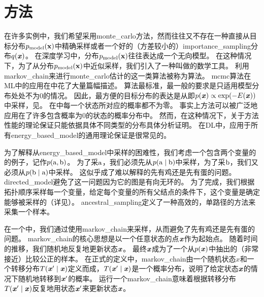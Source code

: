 \section{方法}
\label{sec:markov_chain_monte_carlo_methods}

在许多实例中，我们希望采用\gls{monte_carlo}方法，然而往往又不存在一种直接从目标分布$p_{\text{model}}(\mathbf{x})$中精确采样或者一个好的（方差较小的）\gls{importance_sampling}分布$q(\boldsymbol{\mathit{x}})$。
在深度学习中，分布$p_{\text{model}}(\mathbf{x})$往往表达成一个无向模型。
在这种情况下，为了从分布$p_{\text{model}}(\mathbf{x})$中近似采样，我们引入了一种叫做的数学工具。
利用\gls{markov_chain}来进行\gls{monte_carlo}估计的这一类算法被称为算法。
\gls{mcmc}算法在\gls{ML}中的应用在\citet{koller-book2009}中花了大量篇幅描述。
算法最标准，最一般的要求是只适用模型分布处处不为$0$的情况。
因此，最方便的目标分布的表达是从即$p(\boldsymbol{\mathit{x}})\propto \exp(-E(\boldsymbol{\mathit{x}}))$中采样，见。
在中每一个状态所对应的概率都不为零。
事实上方法可以被广泛地应用在了许多包含概率为$0$的状态的概率分布中。
然而，在这种情况下，关于方法性能的理论保证只能依据具体不同类型的分布具体分析证明。
在\gls{DL}中，应用于所有\gls{energy_based_model}的通用理论保证是很常见的。


为了解释从\gls{energy_based_model}中采样的困难性，我们考虑一个包含两个变量的的例子，记作$p(\mathrm{a},\mathrm{b})$。
为了采$\mathrm{a}$，我们必须先从$p(\mathrm{a}\mid \mathrm{b})$中采样，为了采$\mathrm{b}$，我们又必须从$p(\mathrm{b}\mid \mathrm{a})$中采样。
这似乎成了难以解释的先有鸡还是先有蛋的问题。
\gls{directed_model}避免了这一问题因为它的图是有向无环的。
为了完成，我们根据拓扑顺序采样每一个变量，给定每个变量的所有父结点的条件下，这个变量是确定能够被采样的（详见）。
\gls{ancestral_sampling}定义了一种高效的，单路径的方法来采集一个样本。


在一个中，我们通过使用\gls{markov_chain}来采样，从而避免了先有鸡还是先有蛋的问题。
\gls{markov_chain}的核心思想是以一个任意状态的点$\boldsymbol{\mathit{x}}$作为起始点。
随着时间的推移，我们随机地反复地更新状态$\boldsymbol{\mathit{x}}$。
最终$\boldsymbol{\mathit{x}}$成为了一个从$p(\boldsymbol{\mathit{x}})$中抽出的（非常接近）比较公正的样本。
在正式的定义中，\gls{markov_chain}由一个随机状态$x$和一个转移分布$T(\boldsymbol{\mathit{x}}'\mid \boldsymbol{\mathit{x}})$定义而成，$T(\boldsymbol{\mathit{x}}'\mid \boldsymbol{\mathit{x}})$是一个概率分布，说明了给定状态$\boldsymbol{\mathit{x}}$的情况下随机地转移到$\boldsymbol{\mathit{x}}'$的概率。
运行一个\gls{markov_chain}意味着根据转移分布$T(\boldsymbol{\mathit{x}}'\mid \boldsymbol{\mathit{x}})$反复地用状态$\boldsymbol{\mathit{x}}'$来更新状态$\boldsymbol{\mathit{x}}$。


